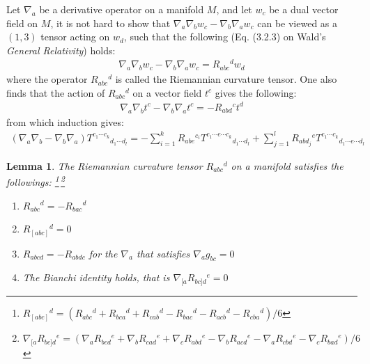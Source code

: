 \documentclass[11pt, onesided]{book}
\theoremstyle{break}
\theoremstyle{break}
\newtheorem{lem}{Lemma}[thm]
\newcommand{\txt}{Wald's \textit{General Relativity}}
\begin{document}
Let $\nabla_a$ be a derivative operator on a manifold $M$, and let $w_c$ be a dual vector field on $M$, it is not hard to show that $\nabla_a \nabla_b w_c -\nabla_b\nabla_aw_c$ can be viewed as a $(1,3)$ tensor acting on $w_d$, such that the following (Eq. (3.2.3) on \txt) holds:
\begin{align*}
\nabla_a \nabla_b w_c -\nabla_b\nabla_aw_c = R_{abc}{}^d w_d
\end{align*}
where the operator $R_{abc}{}^d$ is called the Riemannian curvature tensor. One also finds that the action of $R_{abc}{}^d$ on a vector field $t^c$ gives the following:
\begin{align*}
\nabla_a\nabla_b t^c - \nabla_b\nabla_a t^c = -R_{abd}{}^c t^d
\end{align*}
from which induction gives:
\begin{align*}
(\nabla_a\nabla_b - \nabla_b \nabla_a) T^{c_1 \cdots  c_k}{}_{d_1 \cdots  d_l} = -\sum_{i=1}^k R_{abe}{}^{c_i}T^{c_1 \cdots  e  \cdots  c_k}{}_{d_1\cdots d_l} + \sum_{j=1}^l R_{abd_j}{}^e T^{c_1\cdots c_k}{}_{d_1\cdots e\cdots d_l}
\end{align*}
\begin{lem}
The Riemannian curvature tensor $R_{abc}{}^d$ on a manifold satisfies the followings:  \footnote{$R_{[abc]}{}^d = (R_{abc}{}^d + R_{bca}{}^d + R_{cab}{}^d - R_{bac}{}^d - R_{acb}{}^d - R_{cba}{}^d)/6$}\,\footnote{$\nabla_{[a}R_{bc]d}{}^e = (\nabla_aR_{bcd}{}^e+\nabla_bR_{cad}{}^e + \nabla_c R_{abd}{}^e - \nabla_bR_{acd}{}^e - \nabla_aR_{cbd}{}^e - \nabla_cR_{bad}{}^e)/6$}
\begin{enumerate}[topsep=3pt,itemsep=-1ex,partopsep=1ex,parsep=1ex]
\item $R_{abc}{}^d = -R_{bac}{}^{d}$
\item $R_{[abc]}{}^d = 0$    
\item $R_{abcd} = -R_{abdc}$ for the $\nabla_a$ that satisfies $\nabla_ag_{bc}=0$
\item The Bianchi identity holds, that is $\nabla_{[a}R{}_{bc]d}{}^e = 0$
\end{enumerate}
\end{lem}
\end{document}
